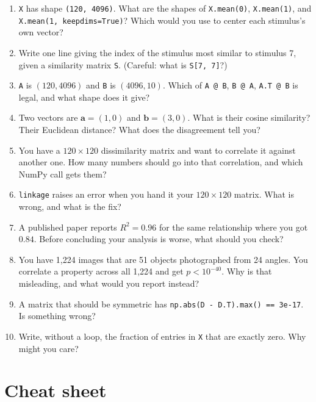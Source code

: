 \documentclass[11pt]{article}
\begin{document}
\begin{enumerate}
\item \texttt{X} has shape \texttt{(120, 4096)}. What are the shapes of
      \texttt{X.mean(0)}, \texttt{X.mean(1)}, and
      \texttt{X.mean(1, keepdims=True)}? Which would you use to center each
      stimulus's own vector?
\item Write one line giving the index of the stimulus most similar to stimulus
      7, given a similarity matrix \texttt{S}. (Careful: what is
      \texttt{S[7, 7]}?)
\item \texttt{A} is $(120, 4096)$ and \texttt{B} is $(4096, 10)$. Which of
      \texttt{A @ B}, \texttt{B @ A}, \texttt{A.T @ B} is legal, and what shape
      does it give?
\item Two vectors are $\bm{a}=(1,0)$ and $\bm{b}=(3,0)$. What is their cosine
      similarity? Their Euclidean distance? What does the disagreement tell you?
\item You have a $120\times120$ dissimilarity matrix and want to correlate it
      against another one. How many numbers should go into that correlation,
      and which NumPy call gets them?
\item \texttt{linkage} raises an error when you hand it your $120\times120$
      matrix. What is wrong, and what is the fix?
\item A published paper reports $R^2 = 0.96$ for the same relationship where you
      got $0.84$. Before concluding your analysis is worse, what should you
      check?
\item You have 1{,}224 images that are 51 objects photographed from 24 angles.
      You correlate a property across all 1{,}224 and get $p < 10^{-40}$. Why is
      that misleading, and what would you report instead?
\item A matrix that should be symmetric has
      \texttt{np.abs(D - D.T).max() == 3e-17}. Is something wrong?
\item Write, without a loop, the fraction of entries in \texttt{X} that are
      exactly zero. Why might you care?
\end{enumerate}

\section{Cheat sheet}
\end{document}
